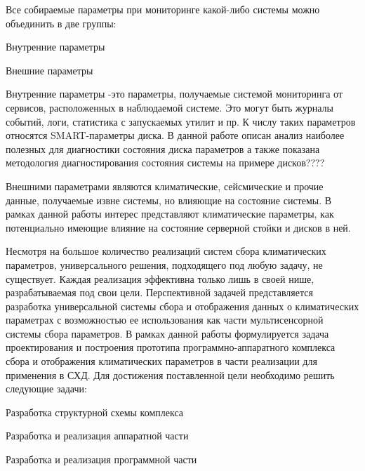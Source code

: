 Все собираемые параметры при мониторинге какой-либо системы можно объединить в две группы: 
\begin{itemize*}
	\item{Внутренние параметры}
	\item{Внешние параметры}
\end{itemize*}	

Внутренние параметры -это параметры, получаемые системой мониторинга от сервисов, расположенных в наблюдаемой системе. Это могут быть журналы событий, логи, статистика с запускаемых утилит и пр. К числу таких параметров относятся SMART-параметры диска. В данной работе описан анализ наиболее полезных для диагностики состояния диска параметров а также показана методология диагностирования состояния системы на примере дисков????

Внешними параметрами являются климатические, сейсмические и прочие данные, получаемые извне системы, но влияющие на состояние системы. В рамках данной работы интерес представляют климатические параметры, как потенциально имеющие влияние на состояние серверной стойки и дисков в ней. 

Несмотря на большое количество реализаций систем сбора климатических параметров, универсального решения, подходящего под любую задачу, не существует. Каждая реализация эффективна только лишь в своей нише, разрабатываемая под свои цели. Перспективной задачей представляется разработка универсальной системы сбора и отображения данных о климатических параметрах с возможностью ее использования как части мультисенсорной системы сбора параметров.  В рамках данной работы формулируется задача проектирования и построения прототипа программно-аппаратного комплекса сбора и отображения климатических параметров в части реализации для применения в СХД. 
Для достижения поставленной цели необходимо решить следующие задачи:
\begin{itemize*}
	\item{Разработка структурной схемы комплекса}
	\item{Разработка и реализация аппаратной части}
	\item{Разработка и реализация программной части}
\end{itemize*}	


